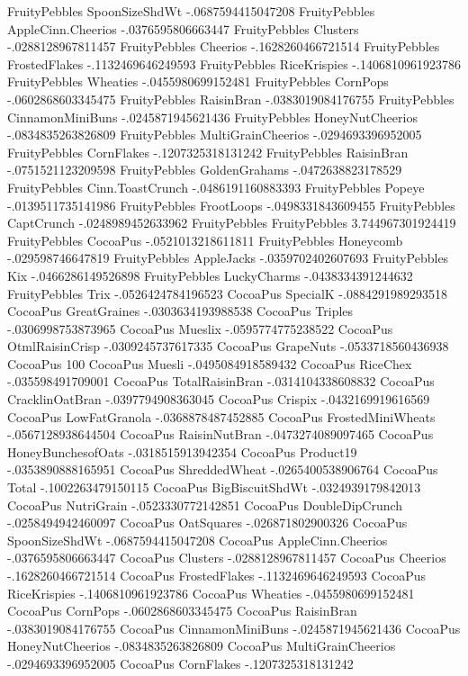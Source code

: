 FruityPebbles	SpoonSizeShdWt	-.0687594415047208
FruityPebbles	AppleCinn.Cheerios	-.0376595806663447
FruityPebbles	Clusters	-.0288128967811457
FruityPebbles	Cheerios	-.1628260466721514
FruityPebbles	FrostedFlakes	-.1132469646249593
FruityPebbles	RiceKrispies	-.1406810961923786
FruityPebbles	Wheaties	-.0455980699152481
FruityPebbles	CornPops	-.0602868603345475
FruityPebbles	RaisinBran	-.0383019084176755
FruityPebbles	CinnamonMiniBuns	-.0245871945621436
FruityPebbles	HoneyNutCheerios	-.0834835263826809
FruityPebbles	MultiGrainCheerios	-.0294693396952005
FruityPebbles	CornFlakes	-.1207325318131242
FruityPebbles	RaisinBran	-.0751521123209598
FruityPebbles	GoldenGrahams	-.0472638823178529
FruityPebbles	Cinn.ToastCrunch	-.0486191160883393
FruityPebbles	Popeye	-.0139511735141986
FruityPebbles	FrootLoops	-.0498331843609455
FruityPebbles	CaptCrunch	-.0248989452633962
FruityPebbles	FruityPebbles	3.744967301924419
FruityPebbles	CocoaPus	-.0521013218611811
FruityPebbles	Honeycomb	-.029598746647819
FruityPebbles	AppleJacks	-.0359702402607693
FruityPebbles	Kix	-.0466286149526898
FruityPebbles	LuckyCharms	-.0438334391244632
FruityPebbles	Trix	-.0526424784196523
CocoaPus	SpecialK	-.0884291989293518
CocoaPus	GreatGraines	-.0303634193988538
CocoaPus	Triples	-.0306998753873965
CocoaPus	Mueslix	-.0595774775238522
CocoaPus	OtmlRaisinCrisp	-.0309245737617335
CocoaPus	GrapeNuts	-.0533718560436938
CocoaPus	100%
CocoaPus	Muesli	-.0495084918589432
CocoaPus	RiceChex	-.035598491709001
CocoaPus	TotalRaisinBran	-.0314104338608832
CocoaPus	CracklinOatBran	-.0397794908363045
CocoaPus	Crispix	-.0432169919616569
CocoaPus	LowFatGranola	-.0368878487452885
CocoaPus	FrostedMiniWheats	-.0567128938644504
CocoaPus	RaisinNutBran	-.0473274089097465
CocoaPus	HoneyBunchesofOats	-.0318515913942354
CocoaPus	Product19	-.0353890888165951
CocoaPus	ShreddedWheat	-.0265400538906764
CocoaPus	Total	-.1002263479150115
CocoaPus	BigBiscuitShdWt	-.0324939179842013
CocoaPus	NutriGrain	-.0523330772142851
CocoaPus	DoubleDipCrunch	-.0258494942460097
CocoaPus	OatSquares	-.026871802900326
CocoaPus	SpoonSizeShdWt	-.0687594415047208
CocoaPus	AppleCinn.Cheerios	-.0376595806663447
CocoaPus	Clusters	-.0288128967811457
CocoaPus	Cheerios	-.1628260466721514
CocoaPus	FrostedFlakes	-.1132469646249593
CocoaPus	RiceKrispies	-.1406810961923786
CocoaPus	Wheaties	-.0455980699152481
CocoaPus	CornPops	-.0602868603345475
CocoaPus	RaisinBran	-.0383019084176755
CocoaPus	CinnamonMiniBuns	-.0245871945621436
CocoaPus	HoneyNutCheerios	-.0834835263826809
CocoaPus	MultiGrainCheerios	-.0294693396952005
CocoaPus	CornFlakes	-.1207325318131242
